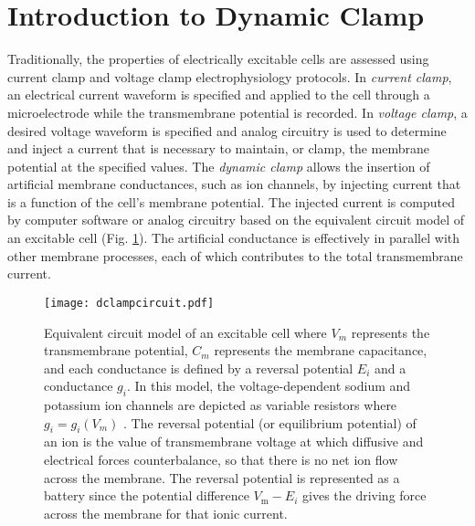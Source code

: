 \section{Introduction to Dynamic Clamp}
Traditionally, the properties of electrically excitable cells are assessed using current clamp and voltage clamp electrophysiology protocols. In \textit{current clamp}, an electrical current waveform is specified and applied to the cell through a microelectrode while the transmembrane potential is recorded. In \textit{voltage clamp}, a desired voltage waveform is specified and analog circuitry is used to determine and inject a current that is necessary to maintain, or clamp, the membrane potential at the specified values. The \textit{dynamic clamp} allows the insertion of artificial membrane conductances, such as ion channels, by injecting current that is a function of the cell's membrane potential. The injected current is computed by computer software or analog circuitry based on the equivalent circuit model of an excitable cell (Fig. \ref{fig:circuit}). The artificial conductance is effectively in parallel with other membrane processes, each of which contributes to the total transmembrane current. 

\begin{figure} 
\begin{center}
\texttt{[image: dclampcircuit.pdf]}
\caption[Equivalent circuit model of an excitable cell]{Equivalent circuit model of an excitable cell where $V_m$ represents the transmembrane potential, $C_m$ represents the membrane capacitance, and each conductance is defined by a reversal potential $E_{i}$ and a conductance $g_{i}$. In this model, the voltage-dependent sodium and potassium ion channels are depicted as variable resistors where $g_{i}=g_{i}(V_{m})$ . The reversal potential (or equilibrium potential) of an ion is the value of transmembrane voltage at which diffusive and electrical forces counterbalance, so that there is no net ion flow across the membrane. The reversal potential is represented as a battery since the potential difference $V_{\textrm{m}}-E_{i}$ gives the driving force across the membrane for that ionic current.} 
\label{fig:circuit} 
\end{center}
\end{figure}

